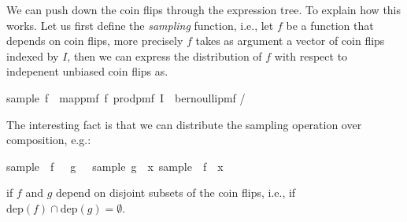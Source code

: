 We can push down the coin flips through the expression tree.
To explain how this works.
Let us first define the \emph{sampling} function, i.e., let $f$ be a function that depends on coin flips, more precisely $f$ takes as argument a vector of coin flips indexed by $I$, then we can express the distribution of $f$ with respect to indepenent unbiased coin flips as.
\begin{isabelle_cm}
  sample\ f\ \isacharequal\ map{\isacharunderscore}pmf\ f\ {\isacharparenleft}prod{\isacharunderscore}pmf\ I\ {\isacharparenleft}\isasymlambda\isacharunderscore\isachardot\ bernoulli{\isacharunderscore}pmf \isacharparenleft{}/\isacharparenright\isacharparenright\isacharparenright
\end{isabelle_cm}
The interesting fact is that we can distribute the sampling operation over composition, e.g.:
\begin{isabelle_cm}
  sample\ \isacharparenleft\isasymlambda\isasymomega\isachardot\ f\ \isasymomega\ \isasymcirc\ g\ \isasymomega{\isacharparenright}\ \isacharequal\ sample\ g\ \isasymbind\ \isacharparenleft{\isasymlambda}x\isachardot\ sample\ \isacharparenleft\isasymlambda\isasymomega\isachardot\ f\ \isasymomega\isachardot\ x\isacharparenright\isacharparenright
\end{isabelle_cm}
if $f$ and $g$ depend on disjoint subsets of the coin flips, i.e., if $\mathrm{dep}(f) \cap \mathrm{dep}(g) = \emptyset$.


